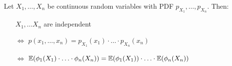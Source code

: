 \begin{proposition}
  Let \(X_1, \ldots, X_n\) be continuous random variables with PDF \(p_{X_1}, \ldots, p_{X_n}\). Then:
  \begin{itemize}
    \item[] \(X_1, \ldots X_n\) are independent
    \item[\(\Leftrightarrow\)] \(p(x_1, \ldots, x_n) = p_{X_1}(x_1) \cdot \ldots \cdot p_{X_n}(x_n)\)
    \item[\(\Leftrightarrow\)] \(\mathbb{E}(\phi_1(X_1) \cdot \ldots \cdot \phi_n(X_n)) = \mathbb{E}(\phi_1(X_1)) \cdot \ldots \cdot \mathbb{E}(\phi_n(X_n))\)
  \end{itemize}
\end{proposition}
